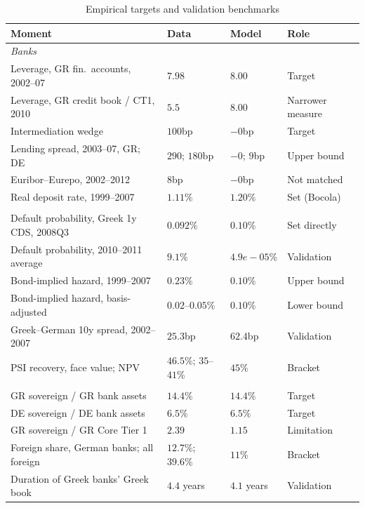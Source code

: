 \begin{table}[H]
  \centering
  \caption{Empirical targets and validation benchmarks}
  \label{tab:targets}
  \footnotesize{}
  \begin{tabular}{llll}
    \toprule
    Moment & Data & Model & Role \\
    \midrule
    \multicolumn{4}{l}{\emph{Banks}} \\
    Leverage, GR fin.\ accounts, 2002--07 & $7.98$ & $8.00$ & Target \\
    Leverage, GR credit book / CT1, 2010 & $5.5$ & $8.00$ & Narrower measure \\
    Intermediation wedge & $100$bp & $-0$bp & Target \\
    Lending spread, 2003--07, GR; DE & $290$; $180$bp & $-0$; $9$bp & Upper bound \\
    Euribor--Eurepo, 2002--2012 & $8$bp & $-0$bp & Not matched \\
    Real deposit rate, 1999--2007 & $1.11\%$ & $1.20\%$ & Set (Bocola) \\
    \addlinespace
    \multicolumn{4}{l}{\emph{Sovereign risk and recovery}} \\
    Default probability, Greek 1y CDS, 2008Q3 & $0.092\%$ & $0.10\%$ & Set directly \\
    Default probability, 2010--2011 average & $9.1\%$ & $4.9e-05\%$ & Validation \\
    Bond-implied hazard, 1999--2007 & $0.23\%$ & $0.10\%$ & Upper bound \\
    Bond-implied hazard, basis-adjusted & $0.02$--$0.05\%$ & $0.10\%$ & Lower bound \\
    Greek--German 10y spread, 2002--2007 & $25.3$bp & $62.4$bp & Validation \\
    PSI recovery, face value; NPV & $46.5\%$; $35$--$41\%$ & $45\%$ & Bracket \\
    \addlinespace
    \multicolumn{4}{l}{\emph{Sovereign exposure}} \\
    GR sovereign / GR bank assets & $14.4\%$ & $14.4\%$ & Target \\
    DE sovereign / DE bank assets & $6.5\%$ & $6.5\%$ & Target \\
    GR sovereign / GR Core Tier 1 & $2.39$ & $1.15$ & Limitation \\
    Foreign share, German banks; all foreign & $12.7\%$; $39.6\%$ & $11\%$ & Bracket \\
    Duration of Greek banks' Greek book & $4.4$ years & $4.1$ years & Validation \\

\end{tabular}
\end{table}
